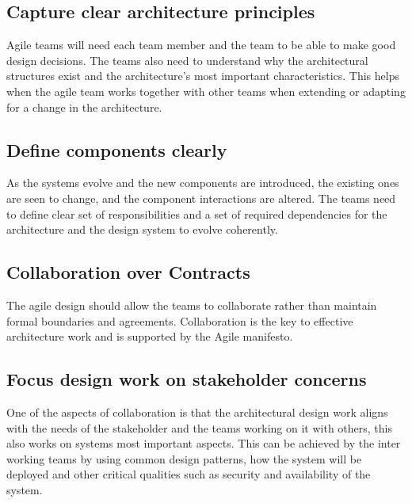 \documentclass[sigconf]{acmart}
\begin{document}
\subsection{Capture clear architecture principles}
Agile teams will need each team member and the team to be able to make good design decisions. The teams also need to understand why the architectural structures exist and the architecture's most important characteristics. This helps when the agile team works together with other teams when extending or adapting for a change in the architecture.

\subsection{Define components clearly}
As the systems evolve and the new components are introduced, the existing ones are seen to change, and the component interactions are altered. The teams need to define clear set of responsibilities and a set of required dependencies for the architecture and the design system to evolve coherently.

\subsection{Collaboration over Contracts}
The agile design should allow the teams to collaborate rather than maintain formal boundaries and agreements. Collaboration is the key to effective architecture work and is supported by the Agile manifesto.

\subsection{Focus design work on stakeholder concerns}
One of the aspects of collaboration is that the architectural design work aligns with the needs of the stakeholder and the teams working on it with others, this also works on systems most important aspects. This can be achieved by the inter working teams by using common design patterns, how the system will be deployed and other critical qualities such as security and availability of the system.
\end{document}
